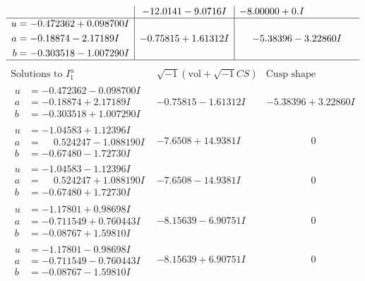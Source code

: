 \documentclass[1p]{elsarticle_modified}
\theoremstyle{definition}
\newcommand{\I}{\sqrt{-1}}
\begin{document}
$$\begin{array}{c|c|c}
 & -12.0141 - 9.0716 I & -8.00000 + 0. I\phantom{ +0.000000I} \\ \hline\begin{aligned}
u &= -0.472362 + 0.098700 I \\
a &= -0.18874 - 2.17189 I \\
b &= -0.303518 - 1.007290 I\end{aligned}
 & -0.75815 + 1.61312 I & -5.38396 - 3.22860 I\\
 \hline 
 \end{array}$$\newpage$$\begin{array}{c|c|c}  
\text{Solutions to }I^u_{1}& \I (\text{vol} + \sqrt{-1}CS) & \text{Cusp shape}\\
 \hline 
\begin{aligned}
u &= -0.472362 - 0.098700 I \\
a &= -0.18874 + 2.17189 I \\
b &= -0.303518 + 1.007290 I\end{aligned}
 & -0.75815 - 1.61312 I & -5.38396 + 3.22860 I \\ \hline\begin{aligned}
u &= -1.04583 + 1.12396 I \\
a &= \phantom{-}0.524247 - 1.088190 I \\
b &= -0.67480 - 1.72730 I\end{aligned}
 & -7.6508 + 14.9381 I & \phantom{-0.000000 } 0 \\ \hline\begin{aligned}
u &= -1.04583 - 1.12396 I \\
a &= \phantom{-}0.524247 + 1.088190 I \\
b &= -0.67480 + 1.72730 I\end{aligned}
 & -7.6508 - 14.9381 I & \phantom{-0.000000 } 0 \\ \hline\begin{aligned}
u &= -1.17801 + 0.98698 I \\
a &= -0.711549 + 0.760443 I \\
b &= -0.08767 + 1.59810 I\end{aligned}
 & -8.15639 - 6.90751 I & \phantom{-0.000000 } 0 \\ \hline\begin{aligned}
u &= -1.17801 - 0.98698 I \\
a &= -0.711549 - 0.760443 I \\
b &= -0.08767 - 1.59810 I\end{aligned}
 & -8.15639 + 6.90751 I & \phantom{-0.000000 } 0 \\ \hline\begin{aligned}

\end{aligned}
\end{array}$$
\end{document}
